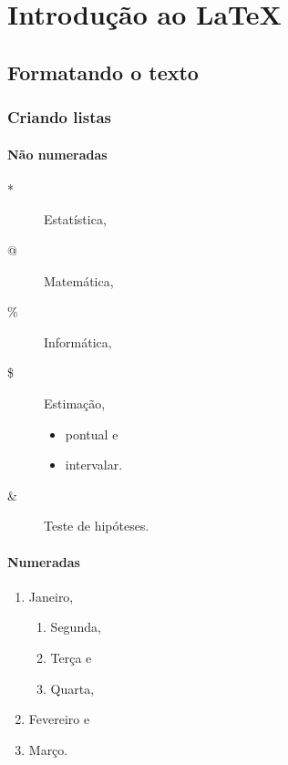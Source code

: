 \documentclass[12pt]{report}
\begin{document}
	
\tableofcontents	
	
	\chapter{Introdução ao \LaTeX}	
	
		\section{Formatando o texto}
		
			\subsection{Criando listas}
			
				\subsubsection{Não numeradas}
				
					\begin{description}
						\item[*]Estatística,
						\item[@] Matemática,
						\item[\%] Informática,
						\item[\$] Estimação,
							\begin{itemize}
								\item pontual e 
								\item intervalar.
							\end{itemize}
					    \item[\&] Teste de hipóteses.
					\end{description}
			
				\subsubsection{Numeradas}
					
					\begin{enumerate}
						\item Janeiro,
							\begin{enumerate}
								\item Segunda,
								\item Terça e 
								\item Quarta,
							\end{enumerate}
						\item Fevereiro e
						\item Março.
						
					\end{enumerate}
				
\end{document}
